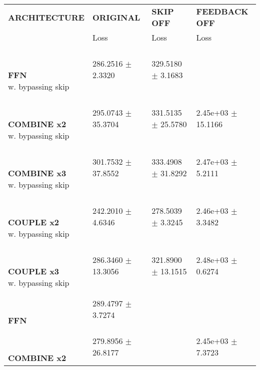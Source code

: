 
\begin{table}[ht]
    \centering
    \begin{tabular}{|>{\columncolor{gray!05}}l|l|l|l|}
        \hline
        \rowcolor{white}
        \textbf{\footnotesize ARCHITECTURE} & \textbf{\footnotesize ORIGINAL} & \textbf{\footnotesize SKIP OFF} & \textbf{\footnotesize FEEDBACK OFF} \\

        \rowcolor{white}
        & {\footnotesize Loss} & {\footnotesize Loss} & {\footnotesize Loss} \\
        \hline
\shortstack[l]{\\ {} \\ \textbf{\footnotesize FFN}\\{\footnotesize w. bypassing skip}} & 286.2516 $\pm$ 2.3320 & 329.5180 $\pm$ 3.1683 &  \\
 \hline 
\shortstack[l]{\\ {} \\ \textbf{\footnotesize COMBINE x2}\\{\footnotesize w. bypassing skip}} & 295.0743 $\pm$ 35.3704 & 331.5135 $\pm$ 25.5780 & 2.45e+03 $\pm$ 15.1166 \\
 \hline 
\shortstack[l]{\\ {} \\ \textbf{\footnotesize COMBINE x3}\\{\footnotesize w. bypassing skip}} & 301.7532 $\pm$ 37.8552 & 333.4908 $\pm$ 31.8292 & 2.47e+03 $\pm$ 5.2111 \\
 \hline 
\shortstack[l]{\\ {} \\ \textbf{\footnotesize COUPLE x2}\\{\footnotesize w. bypassing skip}} & 242.2010 $\pm$ 4.6346 & 278.5039 $\pm$ 3.3245 & 2.46e+03 $\pm$ 3.3482 \\
 \hline 
\shortstack[l]{\\ {} \\ \textbf{\footnotesize COUPLE x3}\\{\footnotesize w. bypassing skip}} & 286.3460 $\pm$ 13.3056 & 321.8900 $\pm$ 13.1515 & 2.48e+03 $\pm$ 0.6274 \\
 \hline 
\shortstack[l]{\\ {} \\ \textbf{\footnotesize FFN}\\{\footnotesize }} & 289.4797 $\pm$ 3.7274 &  &  \\
 \hline 
\shortstack[l]{\\ {} \\ \textbf{\footnotesize COMBINE x2}\\{\footnotesize }} & 279.8956 $\pm$ 26.8177 &  & 2.45e+03 $\pm$ 7.3723 \\

\end{tabular}
\end{table}
